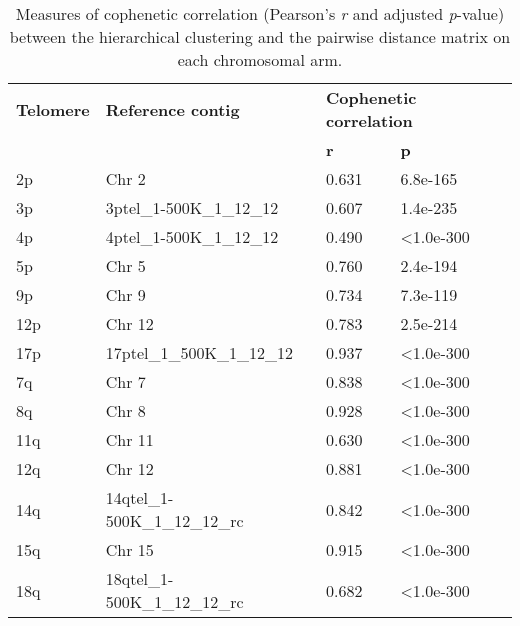 \begin{samepage} \begin{table}[h!] \small \begin{tabular}{llll}
\hline
\textbf{Telomere} & \textbf{Reference contig}       & \multicolumn{2}{l}{\textbf{Cophenetic correlation}} \\
\textbf{}         & \textbf{}                       & \textbf{r} & \textbf{p}  \\
\hline
2p                &  Chr 2                          &  0.631     &  6.8e-165   \\
3p                &  3ptel\_1-500K\_1\_12\_12       &  0.607     &  1.4e-235   \\
4p                &  4ptel\_1-500K\_1\_12\_12       &  0.490     &  <1.0e-300  \\
5p                &  Chr 5                          &  0.760     &  2.4e-194   \\
9p                &  Chr 9                          &  0.734     &  7.3e-119   \\
12p               &  Chr 12                         &  0.783     &  2.5e-214   \\
17p               &  17ptel\_1\_500K\_1\_12\_12     &  0.937     &  <1.0e-300  \\
7q                &  Chr 7                          &  0.838     &  <1.0e-300  \\
8q                &  Chr 8                          &  0.928     &  <1.0e-300  \\
11q               &  Chr 11                         &  0.630     &  <1.0e-300  \\
12q               &  Chr 12                         &  0.881     &  <1.0e-300  \\
14q               &  14qtel\_1-500K\_1\_12\_12\_rc  &  0.842     &  <1.0e-300  \\
15q               &  Chr 15                         &  0.915     &  <1.0e-300  \\
18q               &  18qtel\_1-500K\_1\_12\_12\_rc  &  0.682     &  <1.0e-300  \\
\hline
\end{tabular}
\caption{
    \small Measures of cophenetic correlation (Pearson's \textit{r} and adjusted \textit{p}-value)
    between the hierarchical clustering and the pairwise distance matrix on each chromosomal arm.
}
\label{tab:cophenetic}
\end{table}
\end{samepage}
